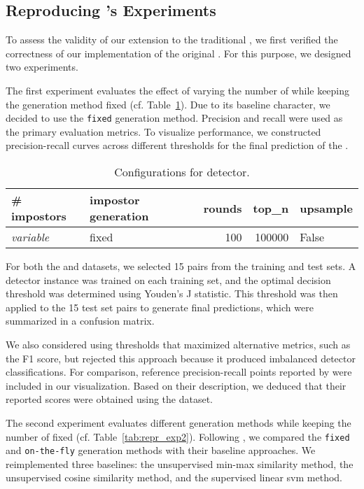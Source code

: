 \subsection{Reproducing \citet{koppel_determining_2014}'s Experiments}

To assess the validity of our extension to the traditional \impAppr{}, we first verified the correctness of our implementation of the original \impAppr{}. 
For this purpose, we designed two experiments.

The first experiment evaluates the effect of varying the number of \imps{} while keeping the \imp{} generation method fixed (cf. Table~\ref{tab:repr_exp1}). 
Due to its baseline character, we decided to use the \texttt{fixed} \imp{} generation method.
Precision and recall were used as the primary evaluation metrics. 
To visualize performance, we constructed precision-recall curves across different thresholds for the final prediction of the \impAppr{}.

\begin{table}[h]
\centering\small
\caption{Configurations for detector.}
\label{tab:repr_exp1}
\begin{tabular}{@{}llrrl@{}}   %
\toprule
\# impostors & impostor generation & rounds & top\_n & upsample \\
\midrule
\textit{variable} & fixed & 100 & \num{100000} & False \\
\bottomrule
\end{tabular}%
\end{table}

For both the \dataBlog{} and \dataStudent{} datasets, we selected 15 pairs from the training and test sets. 
A detector instance was trained on each training set, and the optimal decision threshold was determined using Youden's J statistic. 
This threshold was then applied to the 15 test set pairs to generate final predictions, which were summarized in a confusion matrix.

We also considered using thresholds that maximized alternative metrics, such as the F1 score, but rejected this approach because it produced imbalanced detector classifications. 
For comparison, reference precision-recall points reported by \citet{koppel_determining_2014} were included in our visualization. 
Based on their description, we deduced that their reported scores were obtained using the \dataBlog{} dataset.

The second experiment evaluates different \imp{} generation methods while keeping the number of \imps{} fixed (cf. Table~\ref{tab:repr_exp2}). 
Following \citet{koppel_determining_2014}, we compared the \texttt{fixed} and \texttt{on-the-fly} \imp{} generation methods with their baseline approaches. 
We reimplemented three baselines: the unsupervised min-max similarity method, the unsupervised cosine similarity method, and the supervised linear \ac{svm} method.

